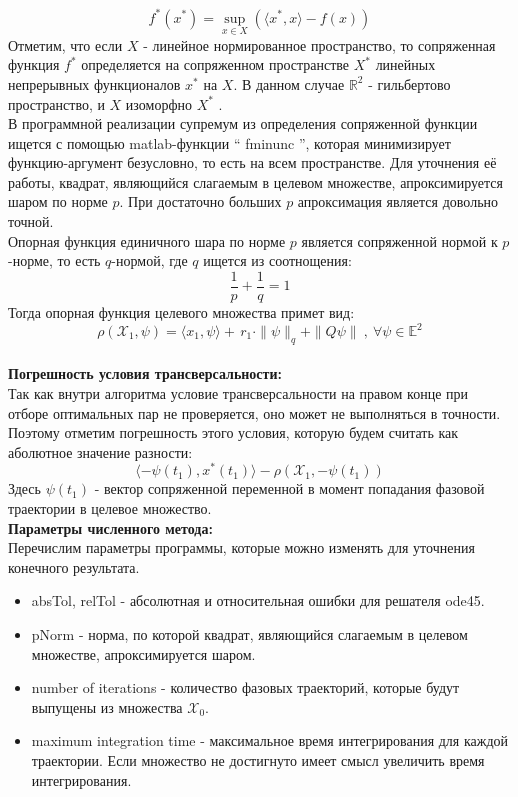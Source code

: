 \documentclass[10pt]{article}
\begin{document}
\[ f^{*}(x^{*})=\sup _{x\in X} ( \langle x^{*} , x \rangle -f(x) ) \]
Отметим, что если \( X \) - линейное нормированное пространство, то сопряженная функция \( f^{*} \) определяется на сопряженном пространстве \( X^{*} \) линейных непрерывных функционалов \( x^{*} \) 
\newpage
\noindent на \( X \). В данном случае \( \mathbb{R}^2 \) - гильбертово пространство, и \( X \) изоморфно \( X^{*} \) .\smallskip\\
В программной реализации супремум из определения сопряженной функции ищется с помощью matlab-функции `` fminunc '', которая минимизирует функцию-аргумент безусловно, то есть на всем пространстве. Для уточнения её работы, квадрат, являющийся слагаемым в целевом множестве, апроксимируется шаром по норме \( p \). При достаточно больших \( p \) апроксимация является довольно точной.\smallskip\\
Опорная функция единичного шара по норме \( p \) является сопряженной нормой к \(p\)-норме, то есть \(q\)-нормой, где \(q \) ищется из соотнощения:
\[ \frac{1}{p} + \frac{1}{q} = 1 \]
Тогда опорная функция целевого множества примет вид:
\[ \rho(\mathcal{X}_1, \psi) =  \langle x_1, \psi \rangle + \, r_1 \cdot \|\psi\|_q + \|Q\psi\| \ , \ \forall \psi \in \mathbb{E}^2\]
\smallskip\\
\textbf{Погрешность условия трансверсальности:}\medskip\\
Так как внутри алгоритма условие трансверсальности на правом конце при отборе оптимальных пар не проверяется, оно может не выполняться в точности. Поэтому отметим погрешность этого условия, которую будем считать как аболютное значение разности:
\[ \langle -\psi(t_1), x^*(t_1) \rangle - \rho(\mathcal{X}_1 , -\psi(t_1)) \]
Здесь \( \psi(t_1) \) - вектор сопряженной переменной в момент попадания фазовой траектории в целевое множество. \medskip\\
\textbf{Параметры численного метода:}\medskip\\
Перечислим параметры программы, которые можно изменять для уточнения конечного результата. 
\begin{itemize}
	\item absTol, relTol - абсолютная и относительная ошибки для решателя ode45.
	\item pNorm - норма, по которой квадрат, являющийся слагаемым в целевом множестве, апроксимируется шаром.
	\item number of iterations - количество фазовых траекторий, которые будут выпущены из множества \( \mathcal{X}_0 \). 
	\item maximum integration time - максимальное время интегрирования для каждой траектории. Если множество не достигнуто имеет смысл увеличить время интегрирования.
\end{itemize}
\end{document}
